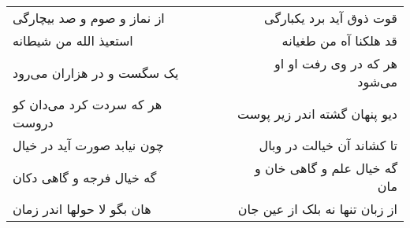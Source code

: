\begin{center}
\begin{longtable}{l p{0.5cm} r}
از نماز و صوم و صد بیچارگی
&&
قوت ذوق آید برد یکبارگی
\\
استعیذ الله من شیطانه
&&
قد هلکنا آه من طغیانه
\\
یک سگست و در هزاران می‌رود
&&
هر که در وی رفت او او می‌شود
\\
هر که سردت کرد می‌دان کو دروست
&&
دیو پنهان گشته اندر زیر پوست
\\
چون نیابد صورت آید در خیال
&&
تا کشاند آن خیالت در وبال
\\
گه خیال فرجه و گاهی دکان
&&
گه خیال علم و گاهی خان و مان
\\
هان بگو لا حولها اندر زمان
&&
از زبان تنها نه بلک از عین جان
\\
\end{longtable}
\end{center}
